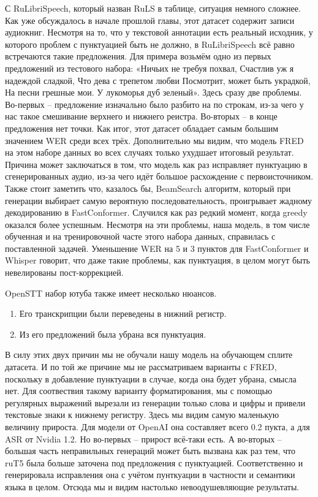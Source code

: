 С RuLibriSpeech, который назван RuLS в таблице, ситуация немного сложнее.
Как уже обсуждалось в начале прошлой главы, этот датасет содержит записи аудиокниг.
Несмотря на то, что у текстовой аннотации есть реальный исходник, у которого проблем с пунктуацией быть не должно, в RuLibriSpeech всё равно встречаются такие предложения.
Для примера возьмём одно из первых предложений из тестового набора:
«Ничьих не требуя похвал, Счастлив уж я надеждой сладкой, Что дева с трепетом любви Посмотрит, может быть украдкой, На песни грешные мои. У лукоморья дуб зеленый».
Здесь сразу две проблемы.
Во-первых -- предложение изначально было разбито на по строкам, из-за чего у нас такое смешивание верхнего и нижнего реистра.
Во-вторых -- в конце предложения нет точки.
Как итог, этот датасет обладает самым большим значением WER среди всех трёх.
Дополнительно мы видим, что модель FRED на этом наборе данных во всех случаях только ухудшает итоговый результат.
Причина может заключаться в том, что модель как раз исправляет пунктуацию в сгенерированных аудио, из-за чего идёт большое расхождение с первоисточником.
Также стоит заметить что, казалось бы, BeamSearch алгоритм, который при генерации выбирает самую вероятную последовательность, проигрывает жадному декодированию в FastConformer.
Случился как раз редкий момент, когда greedy оказался более успешным.
Несмотря на эти проблемы, наша модель, в том числе обученная  и на тренировочной часте этого набора данных, справилась с поставленной задачей.
Уменьшение WER на 5 и 3 пунктов для FastConformer и Whisper говорит, что даже такие проблемы, как пунктуация, в целом могут быть невелированы пост-коррекцией.

OpenSTT набор ютуба также имеет несколько нюансов.
\begin{enumerate}
  \item Его транскрипции были переведены в нижний регистр.
  \item Из его предложений была убрана вся пунктуация.
\end{enumerate}

В силу этих двух причин мы не обучали нашу модель на обучающем сплите датасета.
И по той же причине мы не рассматриваем варианты с FRED, поскольку в добавление пунктуации в случае, когда она будет убрана, смысла нет.
Для соотвествия такому варианту форматирования, мы с помощью регулярных выражений вырезали из генерации только слова и цифры и привели текстовые знаки к нижнему регистру.
Здесь мы видим самую маленькую величину прироста.
Для модели от OpenAI она составляет всего 0.2 пукта, а для ASR от Nvidia 1.2.
Но во-первых -- прирост всё-таки есть.
А во-вторых -- большая часть неправильных генераций может быть вызвана как раз тем, что ruT5 была больше заточена под предложения с пунктуацией.
Соответственно и генерировала исправления она с учётом пунткуации в частности и семантики языка в целом.
Отсюда мы и видим настолько невоодушевляющие результаты.

